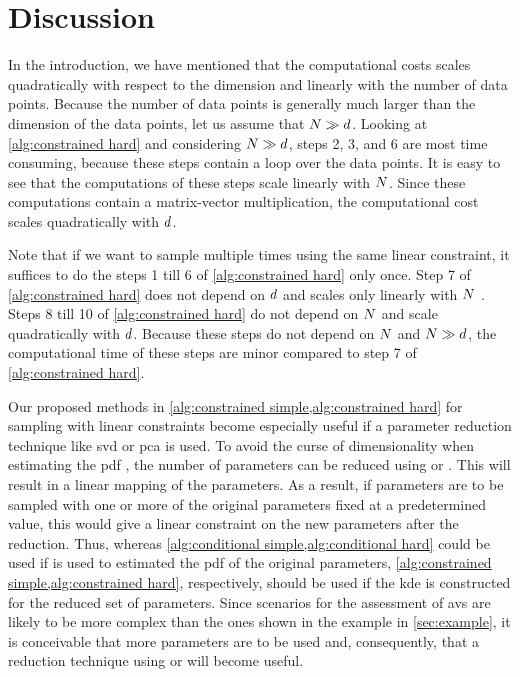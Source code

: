 \section{Discussion}
\label{sec:discussion}

In the introduction, we have mentioned that the computational costs scales quadratically with respect to the dimension and linearly with the number of data points.
Because the number of data points is generally much larger than the dimension of the data points, let us assume that $N \gg d$.
Looking at \cref{alg:constrained hard} and considering $N \gg d$, steps 2, 3, and 6 are most time consuming, because these steps contain a loop over the data points. 
It is easy to see that the computations of these steps scale linearly with $N$. 
Since these computations contain a matrix-vector multiplication, the computational cost scales quadratically with $d$. 

Note that if we want to sample multiple times using the same linear constraint, it suffices to do the steps 1 till 6 of \cref{alg:constrained hard} only once.
Step 7 of \cref{alg:constrained hard} does not depend on $d$ and scales only linearly with $N$ \autocite{vose1991linear}.
Steps 8 till 10 of \cref{alg:constrained hard} do not depend on $N$ and scale quadratically with $d$.
Because these steps do not depend on $N$ and $N \gg d$, the computational time of these steps are minor compared to step 7 of \cref{alg:constrained hard}. 

Our proposed methods in \cref{alg:constrained simple,alg:constrained hard} for sampling with linear constraints become especially useful if a parameter reduction technique like \ac{svd} or \ac{pca} \autocite{abdi2010principal} is used.
To avoid the curse of dimensionality when estimating the \ac{pdf} \autocite{scott1992multivariate}, the number of parameters can be reduced using  or .
This will result in a linear mapping of the parameters.
As a result, if parameters are to be sampled with one or more of the original parameters fixed at a predetermined value, this would give a linear constraint on the new parameters after the reduction.
Thus, whereas \cref{alg:conditional simple,alg:conditional hard} could be used if  is used to estimated the \ac{pdf} of the original parameters, \cref{alg:constrained simple,alg:constrained hard}, respectively, should be used if the \ac{kde} is constructed for the reduced set of parameters.
Since scenarios for the assessment of \acp{av} are likely to be more complex than the ones shown in the example in \cref{sec:example}, it is conceivable that more parameters are to be used and, consequently, that a reduction technique using  or  will become useful.
